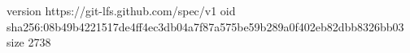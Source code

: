 version https://git-lfs.github.com/spec/v1
oid sha256:08b49b4221517de4ff4ec3db04a7f87a575be59b289a0f402eb82dbb8326bb03
size 2738
